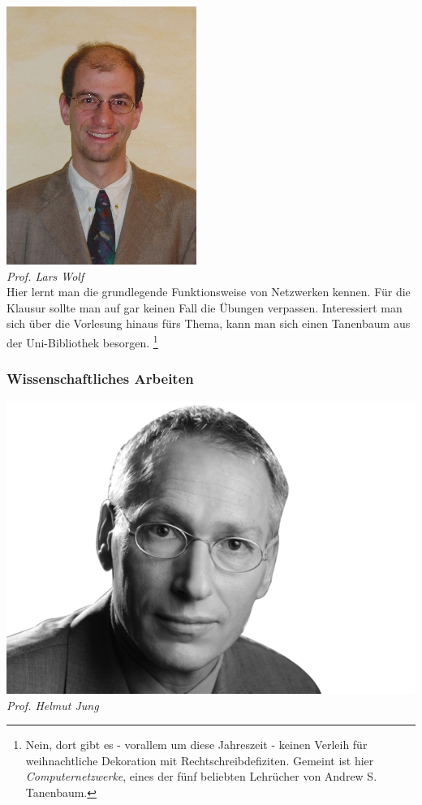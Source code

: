 \includegraphics[width=0.8\linewidth]{bilder/dozenten/wolf}\\
\textit{Prof. Lars Wolf}\\
Hier lernt man die grundlegende Funktionsweise von Netzwerken
kennen. Für die Klausur sollte man auf gar keinen Fall die Übungen
verpassen. Interessiert man sich über die Vorlesung hinaus fürs Thema,
kann man sich einen Tanenbaum aus der Uni-Bibliothek besorgen.
\footnote{Nein, dort gibt es - vorallem um diese Jahreszeit - keinen 
Verleih für weihnachtliche Dekoration mit Rechtschreibdefiziten. 
Gemeint ist hier \textit{Computernetzwerke}, eines der fünf 
beliebten Lehrücher von Andrew S. Tanenbaum.}

\subsubsection{Wissenschaftliches Arbeiten}

\includegraphics[width=0.9\linewidth]{bilder/dozenten/jung_frei.png}\\
\textit{Prof. Helmut Jung}

